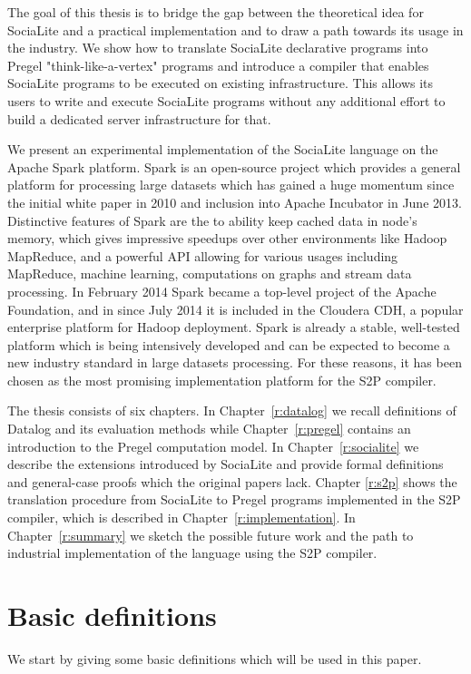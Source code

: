 The goal of this thesis is to bridge the gap between the theoretical idea for SociaLite and a practical implementation and to draw a path towards its usage in the industry. We show how to translate SociaLite declarative programs into Pregel "think-like-a-vertex" programs and introduce a compiler that enables SociaLite programs to be executed on existing infrastructure. This allows its users to write and execute SociaLite programs without any additional effort to build a dedicated server infrastructure for that.

We present an experimental implementation of the SociaLite language on the Apache Spark platform. Spark \cite{spark2} is an open-source project which provides a general platform for processing large datasets which has gained a huge momentum since the initial white paper in 2010 \cite{spark} and inclusion into Apache Incubator in June 2013. Distinctive features of Spark are the to ability keep cached data in node's memory, which gives impressive speedups over other environments like Hadoop MapReduce, and a powerful API allowing for various usages including MapReduce, machine learning, computations on graphs and stream data processing. In February 2014 Spark became a top-level project of the Apache Foundation, and in since July 2014 it is included in the Cloudera CDH, a popular enterprise platform for Hadoop deployment. Spark is already a stable, well-tested platform which is being intensively developed and can be expected to become a new industry standard in large datasets processing. For these reasons, it has been chosen as the most promising implementation platform for the S2P compiler.

The thesis consists of six chapters. In Chapter~\ref{r:datalog} we recall definitions of Datalog and its evaluation methods while Chapter~\ref{r:pregel} contains an introduction to the Pregel computation model. In Chapter~\ref{r:socialite} we describe the extensions introduced by SociaLite and provide formal definitions and general-case proofs which the original papers lack. Chapter \ref{r:s2p} shows the translation procedure from SociaLite to Pregel programs implemented in the S2P compiler, which is described in Chapter~\ref{r:implementation}. In Chapter~\ref{r:summary} we sketch the possible future work and the path to industrial implementation of the language using the S2P compiler.

\section{Basic definitions}\label{r:basicdefs}
We start by giving some basic definitions which will be used in this paper.

